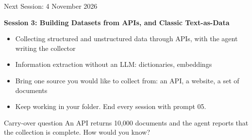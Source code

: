 \documentclass[svgnames,x11names,dvipsnames]{beamer}
\begin{document}
\begin{frame}{Next Session: 4 November 2026}

\textbf{Session 3: Building Datasets from APIs, and Classic Text-as-Data}

\vspace{0.2cm}

\begin{itemize}
    \item Collecting structured and unstructured data through APIs, with the agent writing the collector
    \item Information extraction without an LLM: dictionaries, embeddings
    \item Bring one source you would like to collect from: an API, a website, a set of documents
    \item Keep working in your folder. End every session with prompt 05.
\end{itemize}

\vspace{0.3cm}

\begin{alertblock}{Carry-over question}
An API returns 10,000 documents and the agent reports that the collection is complete. How would you know?
\end{alertblock}

\end{frame}

\end{document}
